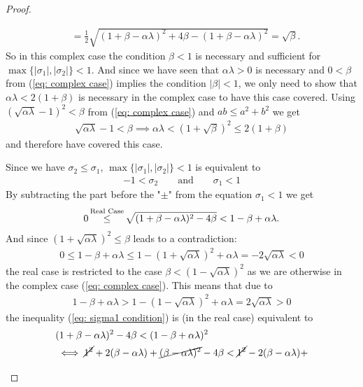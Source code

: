 \begin{proof}
\begin{description}[wide, labelindent=0pt]
\begin{align*}
			&= \tfrac12 \sqrt{(1+\beta-\alpha\lambda)^2 + 4\beta - (1+\beta-\alpha\lambda)^2}
			= \sqrt{\beta}.
		\end{align*}
		So in this complex case the condition
		\(\beta<1\) is necessary and sufficient for \(\max\{|\sigma_1|,|\sigma_2|\}<1\).
		And since we have seen that \(\alpha\lambda>0\) is necessary and \(0<\beta\)
		from (\ref{eq: complex case}) implies the condition \(|\beta|<1\), we only
		need to show that \(\alpha\lambda <2(1+\beta)\) is necessary in the complex
		case to have this case covered. Using \((\sqrt{\alpha\lambda}-1)^2 < \beta\)
		from (\ref{eq: complex case}) and \(ab \le a^2 + b^2\) we get
		\begin{align*}
			\sqrt{\alpha\lambda} - 1
			< \beta \implies \alpha\lambda < (1+\sqrt{\beta})^2
			\le 2(1+\beta)
		\end{align*}
		and therefore have covered this case.
		\item[Real Case:] Since we have \(\sigma_2 \le \sigma_1\),
		\(\max\{|\sigma_1|,|\sigma_2|\}<1\) is equivalent to
		\begin{align*}
			-1 < \sigma_2 \qquad \text{and} \qquad \sigma_1 < 1
		\end{align*}
		By subtracting the part before the "\(\pm\)" from the equation \(\sigma_1<1\)
		we get
		\begin{align}\label{eq: sigma1 condition}
			0\xle{\text{Real Case}} \sqrt{(1+\beta-\alpha\lambda)^2 -4\beta} < 1-\beta +\alpha\lambda.
		\end{align}
		And since \((1+\sqrt{\alpha\lambda})^2 \le \beta\) leads to a contradiction:
		\begin{align*}
			0 \le 1-\beta+\alpha\lambda \le 1-(1+\sqrt{\alpha\lambda})^2 +\alpha\lambda
			= -2\sqrt{\alpha\lambda} < 0
		\end{align*}
		the real case is restricted to the case \(\beta < (1-\sqrt{\alpha\lambda})^2\)
		as we are otherwise in the complex case (\ref{eq: complex case}).
		This means that due to
		\begin{align*}
			1-\beta+\alpha\lambda
			> 1 - (1-\sqrt{\alpha\lambda})^2 + \alpha\lambda
			= 2\sqrt{\alpha\lambda}>0
		\end{align*}
		the inequality (\ref{eq: sigma1 condition}) is (in the real case) equivalent to
		\begin{align*}
			&(1+\beta-\alpha\lambda)^2 - 4\beta < (1-\beta+\alpha\lambda)^2\\
			&\iff \cancel{1^2} + 2(\beta-\alpha\lambda) + 
			\cancel{(\beta-\alpha\lambda)^2} - 4\beta
			< \cancel{1^2} - 2(\beta-\alpha\lambda) + 

\end{align*}
\end{description}
\end{proof}
